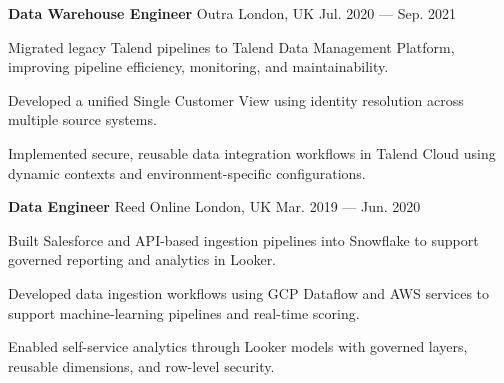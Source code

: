 \begin{cventries}
  \cventry
  {\textbf{Data Warehouse Engineer}} %
  {{\color{awesome-nephritis}Outra} } %
  {London, UK} %
  {Jul. 2020 --- Sep. 2021} %
  {
    \begin{cvitems} %
    \item {Migrated legacy Talend pipelines to Talend Data Management Platform, improving pipeline efficiency, monitoring, and maintainability.}
    \item {Developed a unified Single Customer View using identity resolution across multiple source systems.}
    \item {Implemented secure, reusable data integration workflows in Talend Cloud using dynamic contexts and environment-specific configurations.}
    \end{cvitems}
  }

  \cventry
  {\textbf{Data Engineer}} %
  {{\color{awesome-nephritis}Reed Online} } %
  {London, UK} %
  {Mar. 2019 --- Jun. 2020} %
  {
    \begin{cvitems} %
    \item {Built Salesforce and API-based ingestion pipelines into Snowflake to support governed reporting and analytics in Looker.}
    \item {Developed data ingestion workflows using GCP Dataflow and AWS services to support machine-learning pipelines and real-time scoring.}
    \item {Enabled self-service analytics through Looker models with governed layers, reusable dimensions, and row-level security.}
    \end{cvitems}
  }


\end{cventries}
